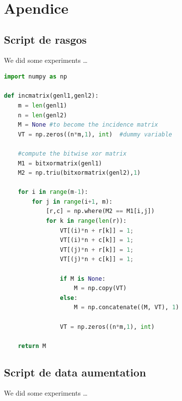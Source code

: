 \documentclass[a4paper, 11pt]{article}
\begin{document}
\pagebreak

\section{Apendice}

\subsection{Script de rasgos}

We did some experiments \ldots

\begin{lstlisting}[language=Python, caption=Python example]
import numpy as np
    
def incmatrix(genl1,genl2):
    m = len(genl1)
    n = len(genl2)
    M = None #to become the incidence matrix
    VT = np.zeros((n*m,1), int)  #dummy variable
    
    #compute the bitwise xor matrix
    M1 = bitxormatrix(genl1)
    M2 = np.triu(bitxormatrix(genl2),1) 

    for i in range(m-1):
        for j in range(i+1, m):
            [r,c] = np.where(M2 == M1[i,j])
            for k in range(len(r)):
                VT[(i)*n + r[k]] = 1;
                VT[(i)*n + c[k]] = 1;
                VT[(j)*n + r[k]] = 1;
                VT[(j)*n + c[k]] = 1;
                
                if M is None:
                    M = np.copy(VT)
                else:
                    M = np.concatenate((M, VT), 1)
                
                VT = np.zeros((n*m,1), int)
    
    return M
\end{lstlisting}


\subsection{Script de data aumentation}

We did some experiments \ldots
\end{document}
